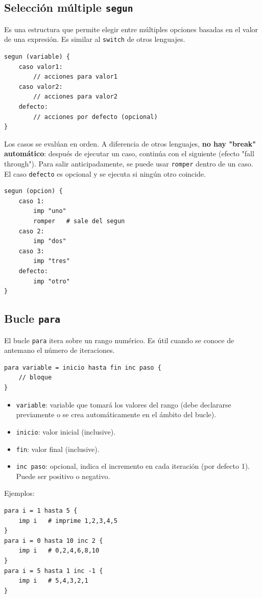 \documentclass[12pt]{article}
\begin{document}
\subsection{Selección múltiple \texttt{segun}}
Es una estructura que permite elegir entre múltiples opciones basadas en el valor de una expresión. Es similar al \texttt{switch} de otros lenguajes.
\begin{lstlisting}
segun (variable) {
    caso valor1:
        // acciones para valor1
    caso valor2:
        // acciones para valor2
    defecto:
        // acciones por defecto (opcional)
}
\end{lstlisting}
Los casos se evalúan en orden. A diferencia de otros lenguajes, \textbf{no hay "break" automático}: después de ejecutar un caso, continúa con el siguiente (efecto "fall through"). Para salir anticipadamente, se puede usar \texttt{romper} dentro de un caso. El caso \texttt{defecto} es opcional y se ejecuta si ningún otro coincide.

\begin{lstlisting}
segun (opcion) {
    caso 1:
        imp "uno"
        romper   # sale del segun
    caso 2:
        imp "dos"
    caso 3:
        imp "tres"
    defecto:
        imp "otro"
}
\end{lstlisting}

\subsection{Bucle \texttt{para}}
El bucle \texttt{para} itera sobre un rango numérico. Es útil cuando se conoce de antemano el número de iteraciones.
\begin{lstlisting}
para variable = inicio hasta fin inc paso {
    // bloque
}
\end{lstlisting}
\begin{itemize}
    \item \texttt{variable}: variable que tomará los valores del rango (debe declararse previamente o se crea automáticamente en el ámbito del bucle).
    \item \texttt{inicio}: valor inicial (inclusive).
    \item \texttt{fin}: valor final (inclusive).
    \item \texttt{inc paso}: opcional, indica el incremento en cada iteración (por defecto 1). Puede ser positivo o negativo.
\end{itemize}
Ejemplos:
\begin{lstlisting}
para i = 1 hasta 5 {
    imp i   # imprime 1,2,3,4,5
}
para i = 0 hasta 10 inc 2 {
    imp i   # 0,2,4,6,8,10
}
para i = 5 hasta 1 inc -1 {
    imp i   # 5,4,3,2,1
}
\end{lstlisting}
\end{document}
